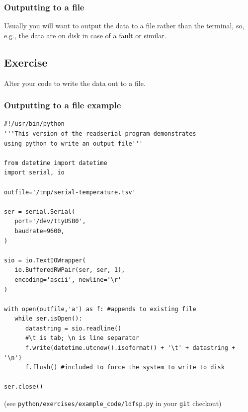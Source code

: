\documentclass[aspectratio=1610,9pt]{beamer} %
\begin{document}
\begin{frame}
\frametitle{Outputting to a file}

Usually you will want to output the data to a file rather than the
terminal, so, e.g., the data are on disk in case of a fault or similar.

\subsection{Exercise}

Alter your code to write the data out to a file.

\end{frame}
\begin{frame}[fragile]
\frametitle{Outputting to a file
example}

\begin{verbatim}
#!/usr/bin/python
'''This version of the readserial program demonstrates
using python to write an output file'''

from datetime import datetime
import serial, io

outfile='/tmp/serial-temperature.tsv'

ser = serial.Serial(
   port='/dev/ttyUSB0',
   baudrate=9600,
)

sio = io.TextIOWrapper(
   io.BufferedRWPair(ser, ser, 1),
   encoding='ascii', newline='\r'
)

with open(outfile,'a') as f: #appends to existing file
   while ser.isOpen():
      datastring = sio.readline()
      #\t is tab; \n is line separator
      f.write(datetime.utcnow().isoformat() + '\t' + datastring + '\n')
      f.flush() #included to force the system to write to disk

ser.close()
\end{verbatim}

(see \texttt{python/exercises/example\_code/ldfsp.py} in your
\texttt{git} checkout)

\end{frame}
\end{document}
